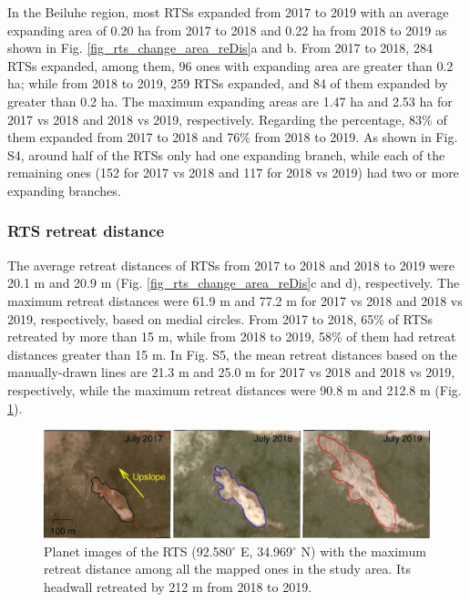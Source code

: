 \documentclass[authoryear,preprint,review,12pt]{elsarticle}
\begin{document}

In the Beiluhe region, most RTSs expanded from 2017 to 2019 with an average expanding area of 0.20 ha from 2017 to 2018 and 0.22 ha from 2018 to 2019 as shown in Fig. \ref{fig_rts_change_area_reDis}a and b.
From 2017 to 2018, 284 RTSs expanded, among them, 96 ones with expanding area are greater than 0.2 ha; while from 2018 to 2019, 259 RTSs expanded, and 84 of them expanded by greater than 0.2 ha.
The maximum expanding areas are 1.47 ha and 2.53 ha for 2017 vs 2018 and 2018 vs 2019, respectively. 
Regarding the percentage, 83\% of them expanded from 2017 to 2018 and 76\% from 2018 to 2019. 
As shown in Fig. S4, around half of the RTSs only had one expanding branch, while each of the remaining ones (152 for 2017 vs 2018 and 117 for 2018 vs 2019)  had two or more expanding branches. 




\subsubsection{RTS retreat distance}
\label{sec_rts_retreat_distance}

The average retreat distances of RTSs from 2017 to 2018 and 2018 to 2019 were 20.1 m and 20.9 m (Fig. \ref{fig_rts_change_area_reDis}c and d), respectively. 
The maximum retreat distances were 61.9 m and 77.2 m for 2017 vs 2018 and 2018 vs 2019, respectively, based on medial circles. 
From 2017 to 2018, 65\% of RTSs retreated by more than 15 m, while from 2018 to 2019, 58\% of them had retreat distances greater than 15 m. 
In Fig. S5, the mean retreat distances based on the manually-drawn lines are 21.3 m and 25.0 m for 2017 vs 2018 and 2018 vs 2019, respectively, while the maximum retreat distances were 90.8 m and 212.8 m (Fig. \ref{fig_rts_example1}).


\begin{figure} 
	\centering
	\includegraphics[width=14cm]{figs/img_2017_to_2019_ex1.jpg}
	\caption{Planet images of the RTS (92.580$^\circ$ E, 34.969$^\circ$ N) with the maximum retreat distance among all the mapped ones in the study area. Its headwall retreated by 212 m from 2018 to 2019.}
	\label{fig_rts_example1}
\end{figure}
\end{document}

